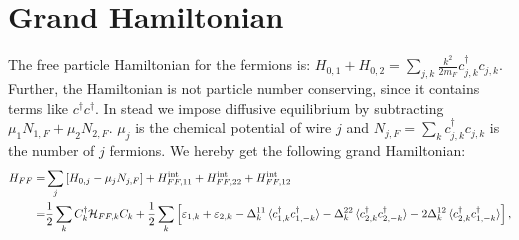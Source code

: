 \section{Grand Hamiltonian} \label{sec.HFFfull}
The free particle Hamiltonian for the fermions is: $H_{0,1} + H_{0,2} = \sum_{j,k}\frac{k^2}{2m_F}c^\dagger_{j,k}c_{j,k}$. Further, the Hamiltonian is not particle number conserving, since it contains terms like $c^\dagger c^\dagger$. In stead we impose diffusive equilibrium by subtracting $\mu_1N_{1,F}+\mu_2N_{2,F}$. $\mu_j$ is the chemical potential of wire $j$ and $N_{j,F} = \sum_k c^\dagger_{j,k}c_{j,k}$ is the number of $j$ fermions. We hereby get the following grand Hamiltonian:
\begin{align}
H_{FF} = &\sum_j \left[H_{0,j} - \mu_j N_{j,F}\right] + H^\text{int}_{FF,11} + H^\text{int}_{FF,22} + H^\text{int}_{FF,12} \nonumber \\
       = &\frac{1}{2}\sum_k C^\dagger_k \mathcal{H}_{FF,k}C_k + \frac{1}{2}\sum_k\left[\varepsilon_{1,k} + \varepsilon_{2,k} - \Delta^{11}_k\braket{c^\dagger_{1,k}c^\dagger_{1,-k}} - \Delta^{22}_k\braket{c^\dagger_{2,k}c^\dagger_{2,-k}} - 2\Delta^{12}_k\braket{c^\dagger_{2,k}c^\dagger_{1,-k}} \right], \nonumber
\end{align}

